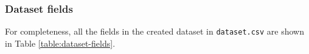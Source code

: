



\subsubsection{Dataset fields}

For completeness, all the fields in the created dataset in \texttt{dataset.csv} are shown in Table \ref{table:dataset-fields}.

